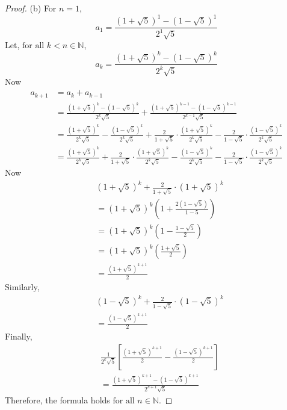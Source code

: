 \documentclass[12pt]{article}
\begin{document}
\begin{proof}
(b) For $n = 1$,
\[
a_1 = \frac{(1+\sqrt{5})^1 - (1-\sqrt{5})^1}{2^1\sqrt{5}}
\]
Let, $\text{for all } k < n \in \mathbb{N}$,
\[
a_k = \frac{(1+\sqrt{5})^k - (1-\sqrt{5})^k}{2^k \sqrt{5}}
\]
Now
\begin{align*}
a_{k+1} & = a_k + a_{k-1} \\
& = \frac{(1+\sqrt{5})^k - (1-\sqrt{5})^k}{2^k \sqrt{5}} + \frac{(1+\sqrt{5})^{k-1} - (1-\sqrt{5})^{k-1}}{2^{k-1} \sqrt{5}} \\
& = \frac{(1+\sqrt{5})^k}{2^k \sqrt{5}} - \frac{(1-\sqrt{5})^k}{2^k \sqrt{5}} + \frac{2}{1 + \sqrt{5}}\cdot \frac{(1+\sqrt{5})^k}{2^k \sqrt{5}} - \frac{2}{1 - \sqrt{5}}\cdot \frac{(1-\sqrt{5})^k}{2^k \sqrt{5}} \\
& = \frac{(1+\sqrt{5})^k}{2^k \sqrt{5}} + \frac{2}{1+\sqrt{5}} \cdot \frac{(1+\sqrt{5})^k}{2^k \sqrt{5}} - \frac{(1-\sqrt{5})^k}{2^k \sqrt{5}} - \frac{2}{1 - \sqrt{5}}\cdot \frac{(1- \sqrt{5})^k}{2^k\sqrt{5}} 
\end{align*}
Now
\begin{align*}
& (1 + \sqrt{5})^k + \frac{2}{1 + \sqrt{5}}\cdot (1 + \sqrt{5})^k \\
& = (1 + \sqrt{5})^k \left( 1 + \frac{2(1-\sqrt{5})}{1 - 5} \right) \\
& = (1 + \sqrt{5})^k (1 - \frac{1 - \sqrt{5}}{2}) \\
& = (1 + \sqrt{5})^k (\frac{1 + \sqrt{5}}{2}) \\
& = \frac{(1 + \sqrt{5})^{k + 1}}{2}
\end{align*}
Similarly,
\begin{align*}
& (1 - \sqrt{5})^k + \frac{2}{1 - \sqrt{5}}\cdot (1 - \sqrt{5})^k \\
& = \frac{(1 - \sqrt{5})^{k+1}}{2}
\end{align*}
Finally,
\begin{align*}
& \frac{1}{2^k \sqrt{5}}[\frac{(1 + \sqrt{5})^{k+1}}{2} - \frac{(1 - \sqrt{5})^{k+1}}{2}] \\
& = \frac{(1 + \sqrt{5})^{k+1} - (1 - \sqrt{5})^{k+1}}{2^{k+1} \sqrt{5}}
\end{align*}
Therefore, the formula holds $\text{for all } n \in \mathbb{N}$.

\end{proof}
\end{document}
